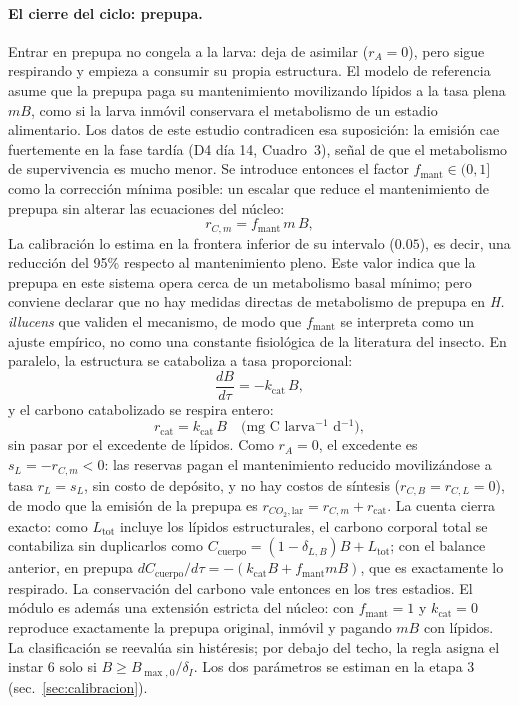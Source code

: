 \paragraph{El cierre del ciclo: prepupa.}
Entrar en prepupa no congela a la larva: deja de asimilar ($r_A = 0$), pero sigue respirando y empieza a consumir su propia estructura. El modelo de referencia asume que la prepupa paga su mantenimiento movilizando lípidos a la tasa plena $mB$, como si la larva inmóvil conservara el metabolismo de un estadio alimentario. Los datos de este estudio contradicen esa suposición: la emisión cae fuertemente en la fase tardía (D4 día 14, Cuadro~3), señal de que el metabolismo de supervivencia es mucho menor. Se introduce entonces el factor $f_{\mathrm{mant}} \in (0,1]$ como la corrección mínima posible: un escalar que reduce el mantenimiento de prepupa sin alterar las ecuaciones del núcleo:
\begin{equation}
  r_{C,m} = f_{\mathrm{mant}}\,m\,B,
  \label{eq:prep-mant}
\end{equation}
La calibración lo estima en la frontera inferior de su intervalo ($0.05$), es decir, una reducción del 95\% respecto al mantenimiento pleno. Este valor indica que la prepupa en este sistema opera cerca de un metabolismo basal mínimo; pero conviene declarar que no hay medidas directas de metabolismo de prepupa en \textit{H. illucens} que validen el mecanismo, de modo que $f_{\mathrm{mant}}$ se interpreta como un ajuste empírico, no como una constante fisiológica de la literatura del insecto. En paralelo, la estructura se cataboliza a tasa proporcional:
\begin{equation}
  \frac{dB}{d\tau} = -k_{\mathrm{cat}}\,B,
  \label{eq:prep-cat}
\end{equation}
y el carbono catabolizado se respira entero:
\begin{equation}
  r_{\mathrm{cat}} = k_{\mathrm{cat}}\,B
  \quad \text{(mg~C larva$^{-1}$ d$^{-1}$)},
  \label{eq:rcat}
\end{equation}
sin pasar por el excedente de lípidos. Como $r_A = 0$, el excedente es $s_L = -r_{C,m} < 0$: las reservas pagan el mantenimiento reducido movilizándose a tasa $r_L = s_L$, sin costo de depósito, y no hay costos de síntesis ($r_{C,B} = r_{C,L} = 0$), de modo que la emisión de la prepupa es $r_{CO_2,\mathrm{lar}} = r_{C,m} + r_{\mathrm{cat}}$. La cuenta cierra exacto: como $L_{\mathrm{tot}}$ incluye los lípidos estructurales, el carbono corporal total se contabiliza sin duplicarlos como $C_{\mathrm{cuerpo}} = (1-\delta_{L,B})B + L_{\mathrm{tot}}$; con el balance anterior, en prepupa $dC_{\mathrm{cuerpo}}/d\tau = -(k_{\mathrm{cat}}B + f_{\mathrm{mant}}mB)$, que es exactamente lo respirado. La conservación del carbono vale entonces en los tres estadios. El módulo es además una extensión estricta del núcleo: con $f_{\mathrm{mant}} = 1$ y $k_{\mathrm{cat}} = 0$ reproduce exactamente la prepupa original, inmóvil y pagando $mB$ con lípidos. La clasificación se reevalúa sin histéresis; por debajo del techo, la regla asigna el instar 6 solo si $B \geq B_{\max,0}/\delta_I$. Los dos parámetros se estiman en la etapa 3 (sec.~\ref{sec:calibracion}).

